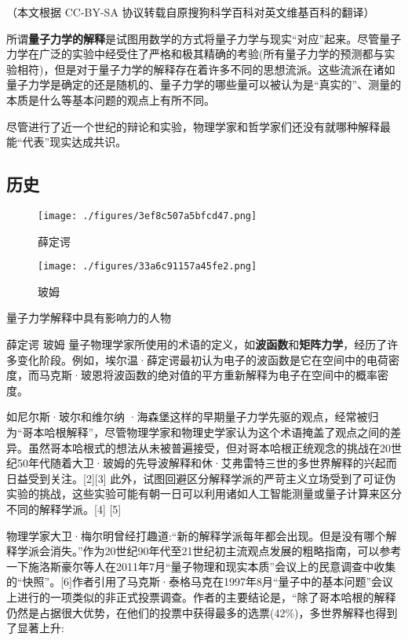 
（本文根据 CC-BY-SA 协议转载自原搜狗科学百科对英文维基百科的翻译）

所谓\textbf{量子力学的解释}是试图用数学的方式将量子力学与现实“对应”起来。尽管量子力学在广泛的实验中经受住了严格和极其精确的考验(所有量子力学的预测都与实验相符)，但是对于量子力学的解释存在着许多不同的思想流派。这些流派在诸如量子力学是确定的还是随机的、量子力学的哪些量可以被认为是“真实的”、测量的本质是什么等基本问题的观点上有所不同。

尽管进行了近一个世纪的辩论和实验，物理学家和哲学家们还没有就哪种解释最能“代表”现实达成共识。

\subsection{历史}

\begin{figure}[ht]
\centering
\texttt{[image: ./figures/3ef8c507a5bfcd47.png]}
\caption{薛定谔} \label{fig_QMinet_1}
\end{figure}

\begin{figure}[ht]
\centering
\texttt{[image: ./figures/33a6c91157a45fe2.png]}
\caption{玻姆} \label{fig_QMinet_2}
\end{figure}

量子力学解释中具有影响力的人物

薛定谔
玻姆
量子物理学家所使用的术语的定义，如\textbf{波函数}和\textbf{矩阵力学}，经历了许多变化阶段。例如，埃尔温·薛定谔最初认为电子的波函数是它在空间中的电荷密度，而马克斯·玻恩将波函数的绝对值的平方重新解释为电子在空间中的概率密度。

如尼尔斯·玻尔和维尔纳 ·海森堡这样的早期量子力学先驱的观点，经常被归为“哥本哈根解释”，尽管物理学家和物理史学家认为这个术语掩盖了观点之间的差异。虽然哥本哈根式的想法从未被普遍接受，但对哥本哈根正统观念的挑战在20世纪50年代随着大卫·玻姆的先导波解释和休·艾弗雷特三世的多世界解释的兴起而日益受到关注。[2][3] 此外，试图回避区分解释学派的严苛主义立场受到了可证伪实验的挑战，这些实验可能有朝一日可以利用诸如人工智能测量或量子计算来区分不同的解释学派。[4] [5]

物理学家大卫·梅尔明曾经打趣道:“新的解释学派每年都会出现。但是没有哪个解释学派会消失。”作为20世纪90年代至21世纪初主流观点发展的粗略指南，可以参考一下施洛斯豪尔等人在2011年7月“量子物理和现实本质”会议上的民意调查中收集的“快照”。[6]作者引用了马克斯·泰格马克在1997年8月“量子中的基本问题”会议上进行的一项类似的非正式投票调查。作者的主要结论是，“除了哥本哈根的解释仍然是占据很大优势，在他们的投票中获得最多的选票(42\%)，多世界解释也得到了显著上升:

